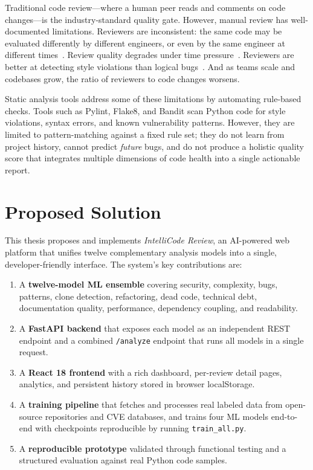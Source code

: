\documentclass[12pt, oneside]{report}
\begin{document}
Traditional code review---where a human peer reads and comments on code changes---is
the industry-standard quality gate. However, manual review has well-documented
limitations. Reviewers are inconsistent: the same code may be evaluated differently by
different engineers, or even by the same engineer at different times~\cite{bacchelli2013}.
Review quality degrades under time pressure~\cite{mcintosh2016}. Reviewers are better
at detecting style violations than logical bugs~\cite{fagan1976}. And as teams scale
and codebases grow, the ratio of reviewers to code changes worsens.

Static analysis tools address some of these limitations by automating rule-based
checks. Tools such as Pylint, Flake8, and Bandit scan Python code for style violations,
syntax errors, and known vulnerability patterns. However, they are limited to
pattern-matching against a fixed rule set; they do not learn from project history,
cannot predict \textit{future} bugs, and do not produce a holistic quality score
that integrates multiple dimensions of code health into a single actionable report.

\section{Proposed Solution}
\label{sec:solution}

This thesis proposes and implements \textit{IntelliCode Review}, an AI-powered web
platform that unifies twelve complementary analysis models into a single, developer-friendly
interface. The system's key contributions are:

\begin{enumerate}[label=\arabic*.]
  \item A \textbf{twelve-model ML ensemble} covering security, complexity, bugs, patterns,
    clone detection, refactoring, dead code, technical debt, documentation quality,
    performance, dependency coupling, and readability.
  \item A \textbf{FastAPI backend} that exposes each model as an independent REST endpoint
    and a combined \texttt{/analyze} endpoint that runs all models in a single request.
  \item A \textbf{React 18 frontend} with a rich dashboard, per-review detail pages,
    analytics, and persistent history stored in browser localStorage.
  \item A \textbf{training pipeline} that fetches and processes real labeled data from
    open-source repositories and CVE databases, and trains four ML models end-to-end
    with checkpoints reproducible by running \texttt{train\_all.py}.
  \item A \textbf{reproducible prototype} validated through functional testing and a
    structured evaluation against real Python code samples.
\end{enumerate}
\end{document}
